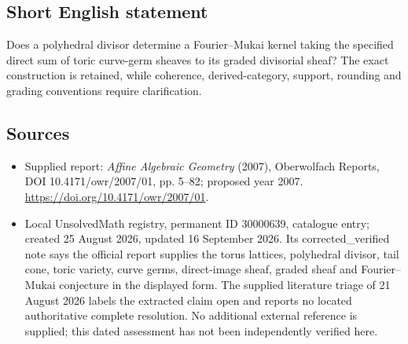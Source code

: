 \documentclass[11pt]{article}
\begin{document}
\subsection{Short English statement}
Does a polyhedral divisor determine a Fourier--Mukai kernel taking the specified direct sum of toric curve-germ sheaves to its graded divisorial sheaf? The exact construction is retained, while coherence, derived-category, support, rounding and grading conventions require clarification.
\subsection{Sources}
\begin{itemize}
\item Supplied report: \emph{Affine Algebraic Geometry} (2007), Oberwolfach Reports, DOI 10.4171/owr/2007/01, pp. 5--82; proposed year 2007. \url{https://doi.org/10.4171/owr/2007/01}.
\item Local UnsolvedMath registry, permanent ID 30000639, catalogue entry; created 25 August 2026, updated 16 September 2026. Its corrected\_verified note says the official report supplies the torus lattices, polyhedral divisor, tail cone, toric variety, curve germs, direct-image sheaf, graded sheaf and Fourier--Mukai conjecture in the displayed form. The supplied literature triage of 21 August 2026 labels the extracted claim open and reports no located authoritative complete resolution. No additional external reference is supplied; this dated assessment has not been independently verified here.
\end{itemize}
\end{document}

